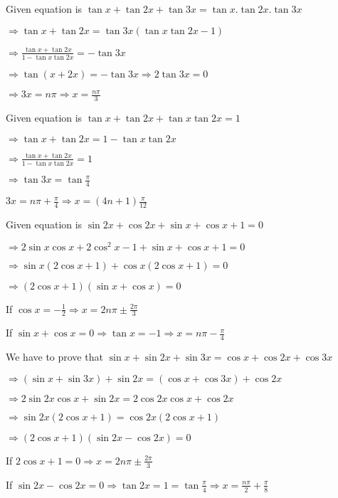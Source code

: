 \item Given equation is $\tan x+ \tan2x + \tan3x = \tan x.\tan2x.\tan3x$

  $\Rightarrow \tan x + \tan2x = \tan3x(\tan x\tan2x - 1)$

  $\Rightarrow \frac{\tan x + \tan 2x}{1 - \tan x\tan2x} = -\tan3x$

  $\Rightarrow \tan(x + 2x) = -\tan3x \Rightarrow 2\tan 3x = 0$

  $\Rightarrow 3x = n\pi \Rightarrow x = \frac{n\pi}{3}$

\item Given equation is $\tan x + \tan 2x + \tan x\tan 2x = 1$

  $\Rightarrow \tan x + \tan2x = 1 - \tan x\tan 2x$

  $\Rightarrow \frac{\tan x + \tan2x}{1 - \tan x\tan2x} = 1$

  $\Rightarrow \tan 3x = \tan\frac{\pi}{4}$

  $3x = n\pi + \frac{\pi}{4} \Rightarrow x = (4n + 1)\frac{\pi}{12}$

\item Given equation is $\sin2x + \cos2x + \sin x + \cos x + 1 = 0$

  $\Rightarrow 2\sin x\cos x + 2\cos^2x - 1 + \sin x + \cos x + 1 = 0$

  $\Rightarrow \sin x(2\cos x + 1) + \cos x(2\cos x + 1) = 0$

  $\Rightarrow (2\cos x + 1)(\sin x + \cos x) = 0$

  If $\cos x = -\frac{1}{2} \Rightarrow x = 2n\pi\pm\frac{2\pi}{3}$

  If $\sin x + \cos x = 0 \Rightarrow \tan x = -1 \Rightarrow x = n\pi - \frac{\pi}{4}$

\item We have to prove that $\sin x + \sin 2x + \sin 3x = \cos x + \cos 2x + \cos 3x$

  $\Rightarrow (\sin x + \sin 3x) + \sin 2x = (\cos x + \cos3x) + \cos 2x$

  $\Rightarrow 2\sin2x\cos x + \sin 2x = 2\cos2x\cos x + \cos 2x$

  $\Rightarrow \sin2x(2\cos x + 1) = \cos2x(2\cos x + 1)$

  $\Rightarrow (2\cos x + 1)(\sin2x - \cos2x) = 0$

  If $2\cos x + 1 = 0 \Rightarrow x = 2n\pi \pm \frac{2\pi}{3}$

  If $\sin 2x - \cos2x = 0 \Rightarrow \tan2x = 1 = \tan\frac{\pi}{4} \Rightarrow x = \frac{n\pi}{2}+\frac{\pi}{8}$


